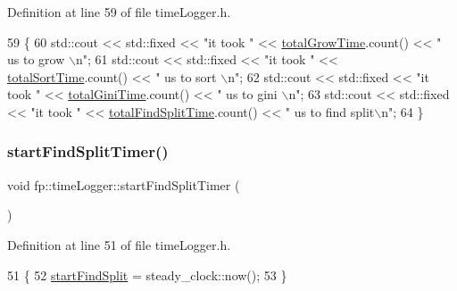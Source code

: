 Definition at line 59 of file time\+Logger.\+h.


\begin{DoxyCode}
59                                        \{
60                 std::cout << std::fixed << \textcolor{stringliteral}{"it took "} << \hyperlink{classfp_1_1timeLogger_ae79b7283b8f150e851fc325c29618ba1}{totalGrowTime}.count() << \textcolor{stringliteral}{" us to grow
      \(\backslash\)n"};
61                 std::cout << std::fixed << \textcolor{stringliteral}{"it took "} << \hyperlink{classfp_1_1timeLogger_a3ac30f8dba0551c3cd3f57dc4806e56e}{totalSortTime}.count() << \textcolor{stringliteral}{" us to sort
      \(\backslash\)n"};
62                 std::cout << std::fixed << \textcolor{stringliteral}{"it took "} << \hyperlink{classfp_1_1timeLogger_a1f1c446894052c4df2100b501069a927}{totalGiniTime}.count() << \textcolor{stringliteral}{" us to gini
      \(\backslash\)n"};
63                 std::cout << std::fixed << \textcolor{stringliteral}{"it took "} << \hyperlink{classfp_1_1timeLogger_a11998b4bff9e1f548f4468e25f79a6f2}{totalFindSplitTime}.count() << \textcolor{stringliteral}{"
       us to find split\(\backslash\)n"};
64             \}
\end{DoxyCode}
\mbox{\label{classfp_1_1timeLogger_a59d92a31ff5b1c845dddcc1836323769}} 
\subsubsection{\texorpdfstring{start\+Find\+Split\+Timer()}{startFindSplitTimer()}}
{\footnotesize\ttfamily void fp\+::time\+Logger\+::start\+Find\+Split\+Timer (\begin{DoxyParamCaption}{ }\end{DoxyParamCaption})\hspace{0.3cm}{\ttfamily [inline]}}



Definition at line 51 of file time\+Logger.\+h.


\begin{DoxyCode}
51                                              \{
52                 \hyperlink{classfp_1_1timeLogger_a1783656ae0d2e107cdfa87766ddc1a8c}{startFindSplit} = steady\_clock::now();
53             \}
\end{DoxyCode}
\mbox{\label{classfp_1_1timeLogger_a706a97bf8610b4fd6196352b8e38b48b}} 
